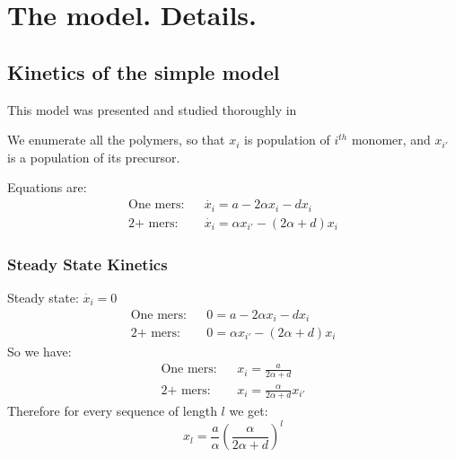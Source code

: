 \documentclass[journal=jacsat,manuscript=article,layout=twocolumn]{achemso}
\newcommand*{\ga}{\alpha}
\newcommand*{\pt}[1]{\left( #1\right)}
\begin{document}
% 
% 


 \newpage
\appendix


\section{The model. Details.}
\subsection{Kinetics of the simple model}
This model was presented and studied thoroughly in 
\cite{nowak2008prevolutionary,Ohtsuki2009,Chen2012}

We enumerate all the polymers, so that $x_i$ is population of $i^{th}$ monomer, and $x_{i'}$ is a 
population of its precursor.

Equations are:
  \begin{eqnarray}
   \mbox{One mers:}&& \dot{x_i}=a-2\ga x_i-dx_i \\
     \mbox{2+ mers:}&& \dot{x_i}=\ga x_{i'}-(2\ga+d)x_i
  \end{eqnarray}

\subsubsection{Steady State Kinetics}\label{sec:nowak-steady}
Steady state: $\dot{x_i}=0$
  \begin{eqnarray}
   \mbox{One mers:}&& 0=a-2\ga x_i-dx_i \\
     \mbox{2+ mers:}&& 0=\ga x_{i'}-(2\ga+d)x_i
  \end{eqnarray}
  So we have:
   \begin{eqnarray}
   \mbox{One mers:}&& x_i=\frac{a}{2\ga+d} \\
     \mbox{2+ mers:}&& x_i=\frac{\ga}{2\ga+d}x_{i'}
  \end{eqnarray}   
 Therefore for every sequence of length $l$ we get:
   \begin{equation}
   \boxed{ x_l=\frac{a}{\ga}\pt{\frac{\ga}{2\ga+d}}^l}
   \end{equation} 
\end{document}
